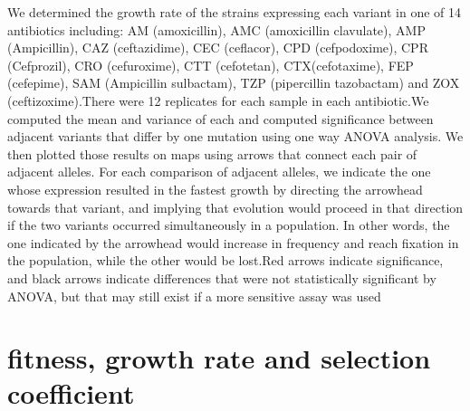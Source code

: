 \documentclass[12pt]{amsart}
\theoremstyle{plain}
\theoremstyle{definition}
\begin{document}
We determined the growth rate of the strains expressing each variant in one of 14 antibiotics including: AM (amoxicillin), AMC (amoxicillin clavulate), AMP (Ampicillin), CAZ (ceftazidime), CEC (ceflacor), CPD (cefpodoxime), CPR (Cefprozil), CRO (cefuroxime), CTT (cefotetan), CTX(cefotaxime), FEP (cefepime), SAM (Ampicillin sulbactam), TZP (pipercillin tazobactam) and ZOX (ceftizoxime).There were 12 replicates for each sample in each antibiotic.We computed the mean and variance of each and computed significance between adjacent variants that differ by one mutation using one way ANOVA analysis.  We then plotted those results on maps using arrows that connect each pair of adjacent alleles.  For each comparison of adjacent alleles, we
indicate the one whose expression resulted in the fastest growth by directing the arrowhead towards that variant, and implying that evolution would proceed in that direction if the two variants occurred simultaneously in a population.  In other words,  the one indicated by the arrowhead would increase in frequency and reach fixation in the population, while the other would be lost.Red arrows indicate significance, and black arrows indicate differences that were not statistically significant by ANOVA, but that may still exist if a more sensitive assay was used

\newpage

\section{fitness, growth rate and selection coefficient}
\end{document}
